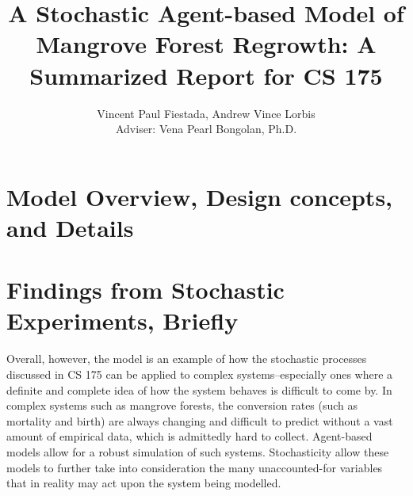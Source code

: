 \documentclass[a4paper]{scl-article}
\begin{document}
\title{A Stochastic Agent-based Model of Mangrove Forest Regrowth: A Summarized Report for CS 175}

\author{Vincent Paul Fiestada, Andrew Vince Lorbis\\Adviser: Vena Pearl Bongolan, Ph.D.}

\maketitle

\begin{multicols}{2}

\section{Model Overview, Design concepts, and Details}

\section{Findings from Stochastic Experiments, Briefly}


Overall, however, the model is an example of how the stochastic processes discussed in CS 175 can be applied to complex systems--especially ones where a definite and complete idea of how the system behaves is difficult to come by. In complex systems such as mangrove forests, the conversion rates (such as mortality and birth) are always changing and difficult to predict without a vast amount of empirical data, which is admittedly hard to collect. Agent-based models allow for a robust simulation of such systems. Stochasticity allow these models to further take into consideration the many unaccounted-for variables that in reality may act upon the system being modelled.

\end{multicols}

\label{sect:bib}


\end{document}
